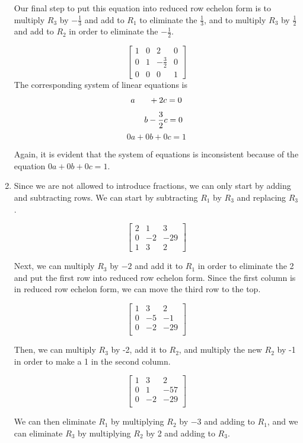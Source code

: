 \documentclass[11pt, letterpaper, twoside]{article}
\begin{document}
\begin{enumerate}
Our final step to put this equation into reduced row echelon form is to multiply $R_3$ by $-\frac{1}{3}$ and add to $R_1$ to eliminate the $\frac{1}{3}$, and to multiply $R_3$ by $\frac{1}{2}$ and add to $R_2$ in order to eliminate the $-\frac{1}{2}$.

$$\begin{bmatrix}
1 & 0 & 2 & 0\\
0 & 1 & -\frac {3}{2} &0\\
0 & 0 & 0 & 1

\end{bmatrix}$$
The corresponding system of linear equations is
$$a\hspace{6mm}+2c=0$$
$$\hspace{6mm}b-\frac {3}{2}c=0$$
$$0a+0b+0c=1$$

Again, it is evident that the system of equations is inconsistent because of the equation $0a+0b+0c=1$.

\item Since we are not allowed to introduce fractions, we can only start by adding and subtracting rows. We can start by subtracting $R_1$ by $R_3$ and replacing $R_3$.

$$\begin{bmatrix}
2 & 1 & 3\\
0 & -2 & -29\\
1 & 3 & 2
\end{bmatrix}$$

Next, we can multiply $R_3$ by $-2$ and add it to $R_1$ in order to eliminate the 2 and put the first row into reduced row echelon form. Since the first column is in reduced row echelon form, we can move the third row to the top.

$$\begin{bmatrix}
1 & 3 & 2\\
0 & -5 & -1\\
0 & -2 & -29\\
\end{bmatrix}$$

Then, we can multiply $R_3$ by -2, add it to $R_2$, and multiply the new $R_2$ by -1 in order to make a 1 in the second column.

$$\begin{bmatrix}
1 & 3 & 2\\
0 & 1 & -57\\
0 & -2 & -29\\
\end{bmatrix}$$

We can then eliminate $R_1$ by multiplying $R_2$ by $-3$ and adding to $R_1$, and we can eliminate $R_3$ by multiplying $R_2$ by 2 and adding to $R_3$.


\end{enumerate}
\end{document}
